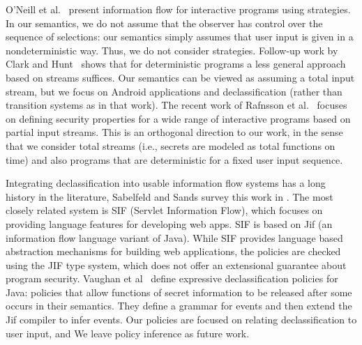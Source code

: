 \documentclass{entcs} \usepackage{entcsmacro}
\begin{document}
O'Neill et al.~\cite{O'Neill:06} present information flow for
interactive programs using strategies. In our semantics, we do not
assume that the observer has control over the sequence of selections:
our semantics simply assumes that user input is given in a
nondeterministic way.  Thus, we do not consider strategies.  Follow-up
work by Clark and Hunt~\cite{Clark:09} shows that for deterministic
programs a less general approach based on streams suffices.  Our
semantics can be viewed as assuming a total input stream, but we focus
on Android applications and declassification (rather than transition
systems as in that work). The recent work of 
Rafnsson et al.~\cite{Rafnsson:12} focuses on defining security
properties for a wide range of interactive programs 
based on partial input streams.  This is
an orthogonal direction to our work, in the sense that we consider
total streams (i.e., secrets are modeled as total functions on time)
and also programs that are deterministic for a fixed user input
sequence. 

Integrating declassification into usable information flow systems has
a long history in the literature, Sabelfeld and Sands survey this work
in \cite{Sabelfeld:05}.  The most closely related system is SIF
(Servlet Information Flow), which focuses on providing language
features for developing web apps.  SIF is based on Jif \cite{Myers:1999} (an information
flow language variant of Java).  While SIF provides language based
abstraction mechanisms for building web applications, the policies are
checked using the JIF type system, which does not offer an extensional
guarantee about program security.  Vaughan et al~\cite{Vaughan:2011}
define expressive declassification policies for Java: policies that
allow functions of secret information to be released after some
occurs in their semantics.  They define a grammar for events and then
extend the Jif compiler to infer events.  Our policies are focused on
relating declassification to user input, and We leave policy inference as
future work.


\end{document}
